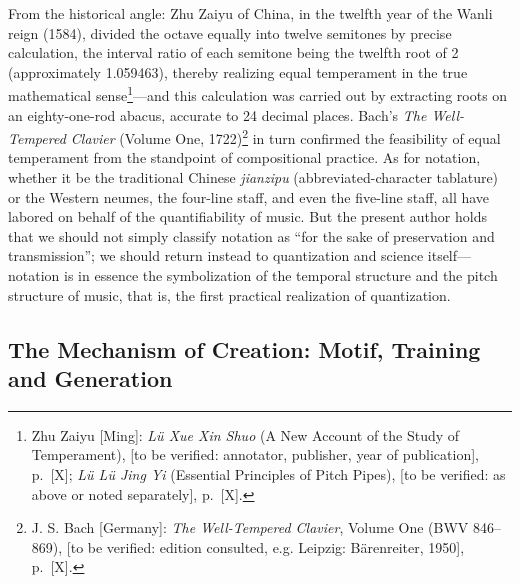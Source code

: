 \documentclass[11pt,a4paper]{article}
\begin{document}
From the historical angle: Zhu Zaiyu of China, in the twelfth year of the Wanli reign
(1584), divided the octave equally into twelve semitones by precise calculation, the
interval ratio of each semitone being the twelfth root of 2 (approximately 1.059463),
thereby realizing equal temperament in the true mathematical sense\footnote{Zhu Zaiyu
[Ming]: \textit{Lü Xue Xin Shuo} (A New Account of the Study of Temperament), [to be
verified: annotator, publisher, year of publication], p.~[X]; \textit{Lü Lü Jing Yi}
(Essential Principles of Pitch Pipes), [to be verified: as above or noted separately],
p.~[X].}---and this calculation was carried out by extracting roots on an eighty-one-rod
abacus, accurate to 24 decimal places. Bach's \textit{The Well-Tempered Clavier} (Volume
One, 1722)\footnote{J. S. Bach [Germany]: \textit{The Well-Tempered Clavier}, Volume One
(BWV 846--869), [to be verified: edition consulted, e.g. Leipzig: Bärenreiter, 1950],
p.~[X].} in turn confirmed the feasibility of equal temperament from the standpoint of
compositional practice. As for notation, whether it be the traditional Chinese
\textit{jianzipu} (abbreviated-character tablature) or the Western neumes, the four-line
staff, and even the five-line staff, all have labored on behalf of the quantifiability of
music. But the present author holds that we should not simply classify notation as
``for the sake of preservation and transmission''; we should return instead to quantization
and science itself---notation is in essence the symbolization of the temporal structure and
the pitch structure of music, that is, the first practical realization of quantization.

\subsection{The Mechanism of Creation: Motif, Training and Generation}
\end{document}
